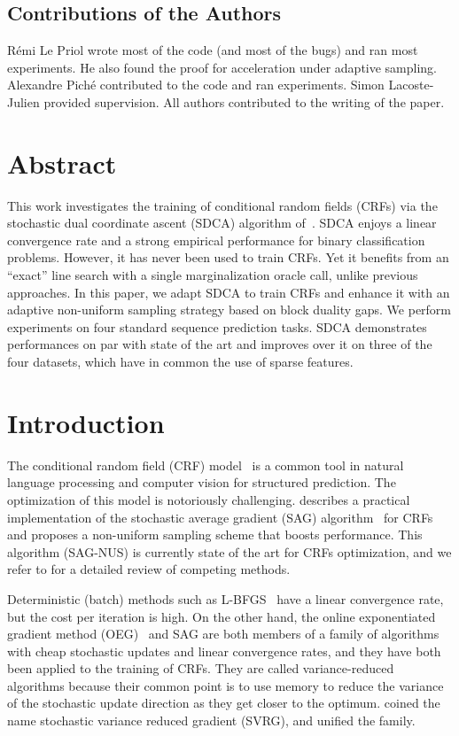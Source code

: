 \subsection*{Contributions of the Authors}
Rémi Le Priol wrote most of the code (and most of the bugs) and ran most experiments.
He also found the proof for acceleration under adaptive sampling.
Alexandre Piché contributed to the code and ran experiments.
Simon Lacoste-Julien provided supervision.
All authors contributed to the writing of the paper.

 \section*{Abstract}
This work investigates the training of conditional random fields (CRFs) via the stochastic dual coordinate ascent (SDCA) algorithm of~\citet{shalev2016accelerated}.
SDCA enjoys a linear convergence rate and a strong empirical performance for binary classification problems.
However, it has never been used to train CRFs.
Yet it benefits from an ``exact'' line search with a single marginalization oracle call, unlike previous approaches.
In this paper, we adapt SDCA to train CRFs and enhance it with an adaptive non-uniform sampling strategy based on block duality gaps.
We perform experiments on four standard sequence prediction tasks.
SDCA demonstrates performances on par with state of the art and improves over it on three of the four datasets, which have in common the use of sparse features.


\section{Introduction}

The conditional random field (CRF) model~\citep{lafferty2001conditional} is a common tool in natural language processing and computer vision for structured prediction.
The optimization of this model is notoriously challenging.
\citet{schmidt2015non} describes a practical implementation of the stochastic average gradient (SAG) algorithm~\citep{roux2012stochastic} for CRFs and proposes a non-uniform sampling scheme that boosts performance.
This algorithm (SAG-NUS) is currently state of the art for CRFs optimization, and we refer to \citet{schmidt2015non} for a detailed review of competing methods.

Deterministic (batch) methods such as L-BFGS~\citep{sha2003shallow,wallach2002efficient} have a linear convergence rate, but the cost per iteration is high.
On the other hand, the online exponentiated gradient method (OEG)~\citep{collins2008exponentiated} and SAG are both members of a family of algorithms with cheap stochastic updates and linear convergence rates, and they have both been applied to the training of CRFs.
They are called variance-reduced algorithms because their common point is to use memory to reduce the variance of the stochastic update direction as they get closer to the optimum.
\citet{johnson2013accelerating} coined the name stochastic variance reduced gradient (SVRG), and \citet{defazio2014saga} unified the family.

